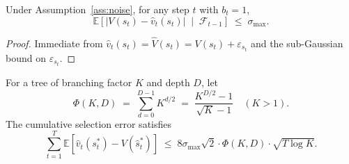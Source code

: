 \begin{lemma}
\label{lem:direct}
Under Assumption~\ref{ass:noise}, for any step $t$ with $b_t = 1$,
\[
  \mathbb{E}\!\left[|V(s_t) - \hat{v}_t(s_t)| \;\middle|\; \mathcal{F}_{t-1}\right]
  \;\leq\; \sigma_{\max}.
\]
\end{lemma}

\begin{proof}
Immediate from $\hat{v}_t(s_t) = \hat{V}(s_t) = V(s_t) + \varepsilon_{s_t}$ and the
sub-Gaussian bound on $\varepsilon_{s_t}$.
\end{proof}

\begin{lemma}
\label{lem:uct}
For a tree of branching factor $K$ and depth $D$, let
\[
  \Phi(K,D) \;=\; \sum_{d=0}^{D-1} K^{d/2} \;=\; \frac{K^{D/2}-1}{\sqrt{K}-1}
  \quad (K > 1).
\]
The cumulative selection error satisfies
\[
  \sum_{t=1}^{T} \mathbb{E}\!\left[\hat{v}_t(s^*_t) - V(\hat{s}^*_t)\right]
  \;\leq\; 8\sigma_{\max}\sqrt{2} \cdot \Phi(K,D) \cdot \sqrt{T\log K}.
\]
\end{lemma}

